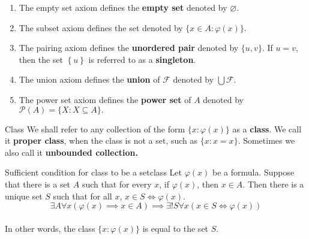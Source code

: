 \begin{remarks}
    \begin{enumerate}
        \item The empty set axiom defines the \textbf{empty set} denoted
            by $\varnothing$.
        \item The subset axiom defines the set denoted by $\{x \in
            A:\varphi(x)\}$.
        \item The pairing axiom defines the \textbf{unordered pair}
            denoted by $\{u, v\}$. If $u = v$, then the set
            $\left\{u\right\}$ is referred to as a \textbf{singleton}.
        \item The union axiom defines the \textbf{union} of $\mathcal{F}$
            denoted by $\bigcup \mathcal{F}$.
        \item The power set axiom defines the \textbf{power set} of $A$
            denoted by $\mathcal{P}(A) = \{X:X \subseteq A\}.$
    \end{enumerate}
\end{remarks}

\begin{definition}{Class}{}
    We shall refer to any collection of the form $\{x:\varphi(x)\}$ as
    a \textbf{class}. We call it \textbf{proper class},
    when the class is not a set, such as $\{x:x=x\}$. Sometimes we also
    call it \textbf{unbounded collection.}
\end{definition}

\begin{theorem}{Sufficient condition for class to be a set}{class}
    Let $\varphi(x)$ be a formula. Suppose that there is a set $A$ such
    that for every $x$, if $\varphi(x)$, then $x \in A$. Then there is
    a unique set $S$ such that for all $x$, $x \in S \iff \varphi(x)$.\\
    \begin{equation*}
        \exists A \forall x (\varphi(x) \implies x \in A) \implies
        \exists ! S \forall x(x \in S \iff \varphi(x))
    \end{equation*}
    \\
    In other words, the class $\{x:\varphi(x)\}$ is equal to the set $S$.
\end{theorem}

